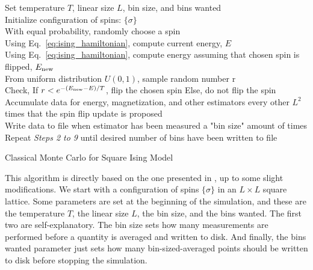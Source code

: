 \documentclass[12pt]{article}
\begin{document}
\begin{algorithm}
Set temperature $T$, linear size $L$, bin size, and bins wanted \\
Initialize configuration of spins: $\lbrace \sigma \rbrace$\\
With equal probability, randomly choose a spin \\
Using Eq.~\eqref{eq:ising_hamiltonian}, compute current energy, $E$\\
Using Eq.~\eqref{eq:ising_hamiltonian}, compute energy assuming that chosen spin is flipped, $E_{\rm{new}}$\\
From uniform distribution $U(0,1)$, sample random number r \\
Check, \linebreak
If $r < e^{-(E_{\rm{new}}-E)/T}$, flip the chosen spin
\linebreak
Else, do not flip the spin \\
Accumulate data for energy, magnetization, and other estimators every other $L^2$ times that the spin flip update is proposed \\
Write data to file when estimator has been measured a "bin size" amount of times \\
Repeat \textit{Steps 2 to 9} until desired number of bins have been written to file
\caption{Classical Monte Carlo for Square Ising Model}
\label{algo:isingMC}
\end{algorithm}

This algorithm is directly based on the one presented in \cite{giordanoCompPhys}, up to some slight modifications. We start with a configuration of spins $\lbrace \sigma \rbrace$ in an $L \times L$ square lattice. Some parameters are set at the beginning of the simulation, and these are the temperature $T$, the linear size $L$, the bin size, and the bins wanted. The first two are self-explanatory. The bin size sets how many measurements are performed before a quantity is averaged and written to disk. And finally, the bins wanted parameter just sets how many bin-sized-averaged points should be written to disk before stopping the simulation.
\end{document}
